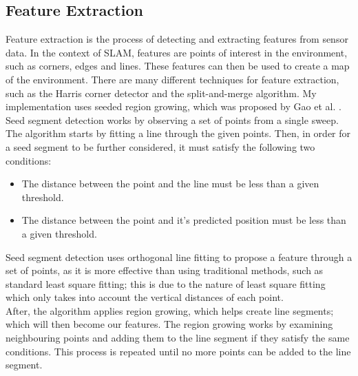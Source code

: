 \documentclass[12pt]{article}
\begin{document}
\subsection{Feature Extraction}
Feature extraction is the process of detecting and extracting features from sensor data. In the context of SLAM, features
are points of interest in the environment, such as corners, edges and lines. These features can then be used to create a map
of the environment. There are many different techniques for feature extraction, such as the Harris corner detector and the
split-and-merge algorithm. My implementation uses seeded region growing, which was proposed by Gao et al.
\cite{seeded_region_growing}.\\
Seed segment detection works by observing a set of points from a single sweep. The algorithm starts by fitting a line through
the given points. Then, in order for a seed segment to be further considered, it must satisfy the following two conditions:
\begin{itemize}
    \item The distance between the point and the line must be less than a given threshold.
    \item The distance between the point and it's predicted position must be less than a given threshold.
\end{itemize}
Seed segment detection uses orthogonal line fitting to propose a feature through a set of points, as it is more effective
than using traditional methods, such as standard least square fitting; this is due to the nature of least square fitting
which only takes into account the vertical distances of each point.\\
After, the algorithm applies region growing, which helps create line segments; which will then become our features. The
region growing works by examining neighbouring points and adding them to the line segment if they satisfy the same conditions.
This process is repeated until no more points can be added to the line segment.\\
\end{document}

